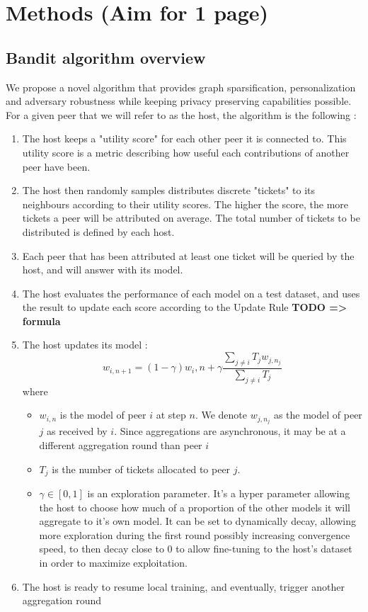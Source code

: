 \documentclass{article}
\begin{document}
    \newpage
    
\section{Methods (Aim for 1 page)}
\label{sec:methods}
    \subsection{Bandit algorithm overview}
    We propose a novel algorithm that provides graph sparsification, personalization and adversary robustness while keeping privacy preserving capabilities possible.
    For a given peer that we will refer to as the host, the algorithm is the following : 
    \begin{enumerate}
        \item The host keeps a "utility score" for each other peer it is connected to. This utility score is a metric describing how useful each contributions of another peer have been.
        \item The host then randomly samples distributes discrete "tickets" to its neighbours according to their utility scores. The higher the score, the more tickets a peer will be attributed on average. The total number of tickets to be distributed is defined by each host.
        \item Each peer that has been attributed at least one ticket will be queried by the host, and will answer with its model.
        \item The host evaluates the performance of each model on a test dataset, and uses the result to update each score according to the Update Rule \textbf{TODO => formula}
        \item The host updates its model : 
        $$w_{i,n+1}=(1-\gamma) w_i,n + \gamma\frac{\sum_{j\neq i} T_j w_{j,n_j}}{\sum_{j\neq i}T_j}$$ 
        where \begin{itemize}
            \item $w_{i,n}$ is the model of peer $i$ at step $n$. We denote $w_{j,n_j}$ as the model of peer $j$ as received by $i$. Since aggregations are asynchronous, it may be at a different aggregation round than peer $i$
            \item $T_j$ is the number of tickets allocated to peer $j$.
            \item $\gamma \in [0,1]$ is an exploration parameter. It's a hyper parameter allowing the host to choose how much of a proportion of the other models it will aggregate to it's own model. It can be set to dynamically decay, allowing more exploration during the first round possibly increasing convergence speed, to then decay close to 0 to allow fine-tuning to the host's dataset in order to maximize exploitation. 
        \end{itemize}
         \item  The host is ready to resume local training, and eventually, trigger another aggregation round
    \end{enumerate}
     
\end{document}
